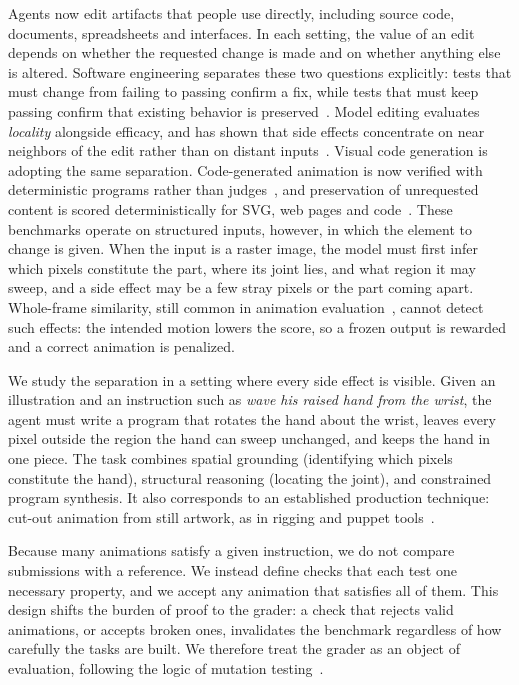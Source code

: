 \documentclass[11pt]{article}
\begin{document}
Agents now edit artifacts that people use directly, including source code, documents, spreadsheets and interfaces. In each setting, the value of an edit depends on whether the requested change is made and on whether anything else is altered. Software engineering separates these two questions explicitly: tests that must change from failing to passing confirm a fix, while tests that must keep passing confirm that existing behavior is preserved~\citep{jimenez2024swebench,chowdhury2024swebenchverified}. Model editing evaluates \emph{locality} alongside efficacy, and has shown that side effects concentrate on near neighbors of the edit rather than on distant inputs~\citep{meng2022rome,mitchell2022mend,yao2023editingllms}. Visual code generation is adopting the same separation. Code-generated animation is now verified with deterministic programs rather than judges~\citep{ma2026motiongraphicsbench,ma2025mover}, and preservation of unrequested content is scored deterministically for SVG, web pages and code~\citep{gupta2026vectorbench,li2026mtweb2code,zhu2026overediting}. These benchmarks operate on structured inputs, however, in which the element to change is given. When the input is a raster image, the model must first infer which pixels constitute the part, where its joint lies, and what region it may sweep, and a side effect may be a few stray pixels or the part coming apart. Whole-frame similarity, still common in animation evaluation~\citep{liang2026vanim,levy2026livesvg,deganutti2026graphicdesignbench}, cannot detect such effects: the intended motion lowers the score, so a frozen output is rewarded and a correct animation is penalized.

We study the separation in a setting where every side effect is visible. Given an illustration and an instruction such as \emph{wave his raised hand from the wrist}, the agent must write a program that rotates the hand about the wrist, leaves every pixel outside the region the hand can sweep unchanged, and keeps the hand in one piece. The task combines spatial grounding (identifying which pixels constitute the hand), structural reasoning (locating the joint), and constrained program synthesis. It also corresponds to an established production technique: cut-out animation from still artwork, as in rigging and puppet tools~\citep{smith2023animateddrawings}.

Because many animations satisfy a given instruction, we do not compare submissions with a reference. We instead define checks that each test one necessary property, and we accept any animation that satisfies all of them. This design shifts the burden of proof to the grader: a check that rejects valid animations, or accepts broken ones, invalidates the benchmark regardless of how carefully the tasks are built. We therefore treat the grader as an object of evaluation, following the logic of mutation testing~\citep{just2014mutants}.
\end{document}

